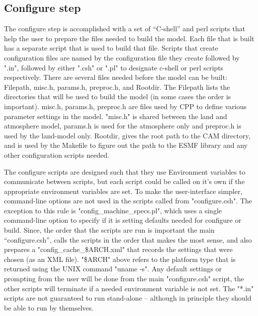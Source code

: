 \documentclass[]{article}
\begin{document}
\subsection{Configure step}
The configure step is accomplished with a set of ``C-shell'' and perl scripts
that help the user to prepare the files needed to build the
model. Each file that is built has a separate script that
is used to build that file. Scripts that create configuration files are
named by the configuration file they create followed by ".in", followed by
either ".csh" or ".pl" to designate c-shell or perl scripts respectively. 
There are several files needed before the model can be built:
Filepath, misc.h, params.h, preproc.h, and Rootdir. The Filepath lists 
the directories that will be used to build the model (in some cases the
order is important). misc.h, params.h, preproc.h are files used by CPP to 
define various parameter settings in the model. "misc.h" is shared between
the land and atmosphere model, params.h is used for the atmosphere only
and preproc.h is used by the land-model only. Rootdir, gives the root path to the CAM
directory, and is used by the Makefile to figure out the path to the ESMF
library and any other configuration scripts needed.

The configure scripts are designed such that they use Environment
variables to communicate between scripts, but each script could be
called on it's own if the appropriate environment variables are set.
To make the user-interface simpler, command-line options are not used 
in the scripts called from "configure.csh". The exception to this
rule is "config\_machine\_specs.pl", which uses a single command-line option
to specify if it is setting defaults needed for configure or build.
Since, the order that the scripts are run is important the main
``configure.csh'', calls the scripts in the order that makes the most
sense, and also prepares a "config\_cache\_\$ARCH.xml" that records the
settings that were chosen (as an XML file). "\$ARCH" above refers to the platform type that is returned
using the UNIX command "uname -s". Any default settings or prompting from the
user will be done from the main "configure.csh" script, the other scripts
will terminate if a needed environment variable is not set. The "*.in" scripts
are not guaranteed to run stand-alone -- although in principle they should
be able to run by themselves.
\end{document}
